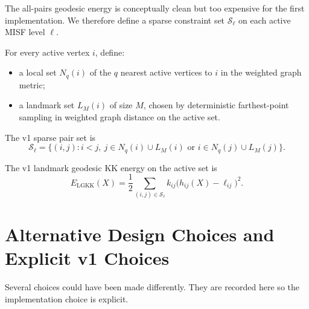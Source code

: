 \documentclass[11pt]{article}
\begin{document}
The all-pairs geodesic energy is conceptually clean but too expensive for the
first implementation. We therefore define a sparse constraint set
$\mathcal{S}_\ell$ on each active MISF level $\ell$.

For every active vertex $i$, define:
\begin{itemize}[leftmargin=1.4em]
  \item a local set $N_q(i)$ of the $q$ nearest active vertices to $i$ in the
    weighted graph metric;
  \item a landmark set $L_M(i)$ of size $M$, chosen by deterministic
    farthest-point sampling in weighted graph distance on the active set.
\end{itemize}

The v1 sparse pair set is
\[
\mathcal{S}_\ell
=
\bigl\{(i,j): i<j,\ j\in N_q(i)\cup L_M(i)
\text{ or } i\in N_q(j)\cup L_M(j)\bigr\}.
\]

The v1 landmark geodesic KK energy on the active set is
\[
E_{\mathrm{LGKK}}(X)
=
\frac{1}{2}\sum_{(i,j)\in \mathcal{S}_\ell}
k_{ij}\bigl(h_{ij}(X)-\ell_{ij}\bigr)^2.
\]

\section{Alternative Design Choices and Explicit v1 Choices}

Several choices could have been made differently. They are recorded here so the
implementation choice is explicit.
\end{document}
